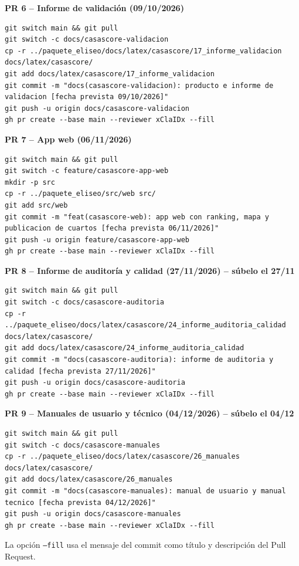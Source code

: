 \documentclass[11pt,a4paper]{article}
\begin{document}
\noindent\textbf{PR 6 -- Informe de validación (09/10/2026)}
\begin{lstlisting}
git switch main && git pull
git switch -c docs/casascore-validacion
cp -r ../paquete_eliseo/docs/latex/casascore/17_informe_validacion docs/latex/casascore/
git add docs/latex/casascore/17_informe_validacion
git commit -m "docs(casascore-validacion): producto e informe de validacion [fecha prevista 09/10/2026]"
git push -u origin docs/casascore-validacion
gh pr create --base main --reviewer xClaIDx --fill
\end{lstlisting}

\noindent\textbf{PR 7 -- App web (06/11/2026)}
\begin{lstlisting}
git switch main && git pull
git switch -c feature/casascore-app-web
mkdir -p src
cp -r ../paquete_eliseo/src/web src/
git add src/web
git commit -m "feat(casascore-web): app web con ranking, mapa y publicacion de cuartos [fecha prevista 06/11/2026]"
git push -u origin feature/casascore-app-web
gh pr create --base main --reviewer xClaIDx --fill
\end{lstlisting}

\noindent\textbf{PR 8 -- Informe de auditoría y calidad (27/11/2026) -- súbelo el 27/11}
\begin{lstlisting}
git switch main && git pull
git switch -c docs/casascore-auditoria
cp -r ../paquete_eliseo/docs/latex/casascore/24_informe_auditoria_calidad docs/latex/casascore/
git add docs/latex/casascore/24_informe_auditoria_calidad
git commit -m "docs(casascore-auditoria): informe de auditoria y calidad [fecha prevista 27/11/2026]"
git push -u origin docs/casascore-auditoria
gh pr create --base main --reviewer xClaIDx --fill
\end{lstlisting}

\noindent\textbf{PR 9 -- Manuales de usuario y técnico (04/12/2026) -- súbelo el 04/12}
\begin{lstlisting}
git switch main && git pull
git switch -c docs/casascore-manuales
cp -r ../paquete_eliseo/docs/latex/casascore/26_manuales docs/latex/casascore/
git add docs/latex/casascore/26_manuales
git commit -m "docs(casascore-manuales): manual de usuario y manual tecnico [fecha prevista 04/12/2026]"
git push -u origin docs/casascore-manuales
gh pr create --base main --reviewer xClaIDx --fill
\end{lstlisting}

\noindent La opción \texttt{--fill} usa el mensaje del commit como título y descripción del Pull Request.
\end{document}
